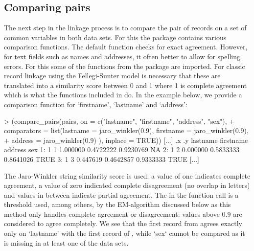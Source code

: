 \subsection{Comparing pairs}
The next step in the linkage process is to compare the pair of records on a set of common variables
in both data sets. For this the package contains various comparison functions. The default function
checks for exact agreement. However, for text fields such as names and addresses, it often better to
allow for spelling errors. For this some of the functions from the 
\citep{stringdist} package are imported. For classic record linkage using the Fellegi-Sunter model
is necessary that these are translated into a similarity score between 0 and 1 where 1 is complete
agreement which is what the functions included in  do. In the example below, we provide
a comparison function for `firstname', `lastname' and `address':
\begin{example}
> (compare_pairs(pairs, on = c("lastname", "firstname", "address", "sex"),
+   comparators = list(lastname = jaro_winkler(0.9), firstname = jaro_winkler(0.9),
+      address = jaro_winkler(0.9) ), inplace = TRUE))
[...]
    .x .y lastname firstname   address   sex
 1:  1  1 1.000000 0.4722222 0.9230769    NA
 2:  1  2 0.000000 0.5833333 0.8641026  TRUE
 3:  1  3 0.447619 0.4642857 0.9333333  TRUE
[...]
\end{example}
The Jaro-Winkler string similarity score is used: a value of one indicates complete agreement, 
a value of zero indicated complete disagreement (no overlap in letters) and values in between
indicate partial agreement. The  in the function call is a threshold used, among others, by
the EM-algorithm discussed below as this method only handles complete agreement or disagreement:
values above 0.9 are considered to agree completely.  We see that the first record from 
agrees exactly only on `lastname' with the first record of , while `sex` cannot be compared
as it is missing in at least one of the data sets. 

